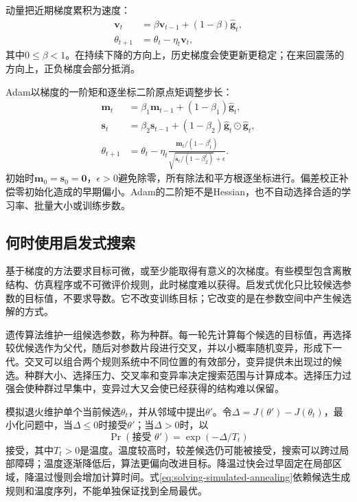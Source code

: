 动量把近期梯度累积为速度：
\begin{align}
 \bm v_t&=\beta\bm v_{t-1}+(1-\beta)\hat{\bm g}_t,\\
 \theta_{t+1}&=\theta_t-\eta_t\bm v_t,
\end{align}
其中$0\leq\beta<1$。在持续下降的方向上，历史梯度会使更新更稳定；在来回震荡的方向上，正负梯度会部分抵消。

Adam以梯度的一阶矩和逐坐标二阶原点矩调整步长\cite{kingma2015adam}：
\begin{align}
 \bm m_t&=\beta_1\bm m_{t-1}+(1-\beta_1)\hat{\bm g}_t,\\
 \bm s_t&=\beta_2\bm s_{t-1}+(1-\beta_2)\hat{\bm g}_t\odot\hat{\bm g}_t,\\
 \theta_{t+1}&=\theta_t-\eta_t\frac{\bm m_t/(1-\beta_1^t)}{\sqrt{\bm s_t/(1-\beta_2^t)}+\epsilon}.
 \label{eq:solving-adam}
\end{align}
初始时$\bm m_0=\bm s_0=\bm0$，$\epsilon>0$避免除零，所有除法和平方根逐坐标进行。偏差校正补偿零初始化造成的早期偏小。Adam的二阶矩不是Hessian，也不自动选择合适的学习率、批量大小或训练步数。

\subsection{何时使用启发式搜索}
基于梯度的方法要求目标可微，或至少能取得有意义的次梯度。有些模型包含离散结构、仿真程序或不可微评价规则，此时梯度难以获得。启发式优化只比较候选参数的目标值，不要求导数。它不改变训练目标；它改变的是在参数空间中产生候选解的方式。

遗传算法维护一组候选参数，称为种群。每一轮先计算每个候选的目标值，再选择较优候选作为父代，随后对参数片段进行交叉，并以小概率随机变异，形成下一代。交叉可以组合两个规则系统中不同位置的有效部分，变异提供未出现过的候选。种群大小、选择压力、交叉率和变异率决定搜索范围与计算成本。选择压力过强会使种群过早集中，变异过大又会使已经获得的结构难以保留。

模拟退火维护单个当前候选$\theta_t$，并从邻域中提出$\theta'$。令$\Delta=J(\theta')-J(\theta_t)$，最小化问题中，当$\Delta\leq0$时接受$\theta'$；当$\Delta>0$时，以
\begin{equation}
 \Pr(\text{接受 }\theta')=\exp(-\Delta/T_t)
 \label{eq:solving-simulated-annealing}
\end{equation}
接受，其中$T_t>0$是温度。温度较高时，较差候选仍可能被接受，搜索可以跨过局部障碍；温度逐渐降低后，算法更偏向改进目标。降温过快会过早固定在局部区域，降温过慢则会增加计算时间。式\eqref{eq:solving-simulated-annealing}依赖候选生成规则和温度序列，不能单独保证找到全局最优。

